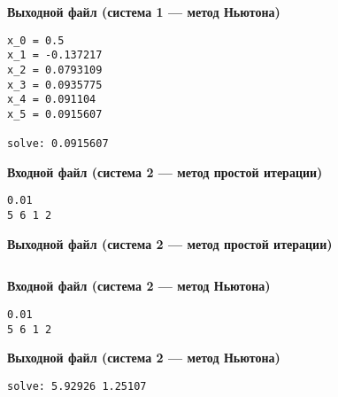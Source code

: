 \textbf{Выходной файл (система 1 --- метод Ньютона)}
\begin{verbatim}
x_0 = 0.5
x_1 = -0.137217
x_2 = 0.0793109
x_3 = 0.0935775
x_4 = 0.091104
x_5 = 0.0915607

solve: 0.0915607
\end{verbatim}

\textbf{Входной файл (система 2 --- метод простой итерации)}
\begin{verbatim}
0.01
5 6 1 2
\end{verbatim}

\textbf{Выходной файл (система 2 --- метод простой итерации)}
\begin{verbatim}

\end{verbatim}

\textbf{Входной файл (система 2 --- метод Ньютона)}
\begin{verbatim}
0.01
5 6 1 2
\end{verbatim}

\textbf{Выходной файл (система 2 --- метод Ньютона)}
\begin{verbatim}
solve: 5.92926 1.25107 
\end{verbatim}

\pagebreak
